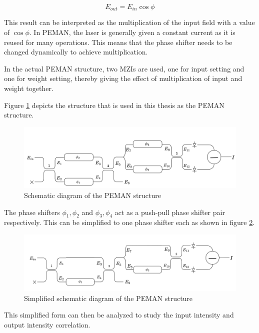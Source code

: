 \begin{equation}
	E_{out} = E_{in}\cos \phi
\end{equation}

This result can be interpreted as the multiplication of the input field with a value of $\cos \phi$. In PEMAN, the laser is generally given a constant current as it is reused for many operations. This means that the phase shifter needs to be changed dynamically to achieve multiplication.

In the actual PEMAN structure, two MZIs are used, one for input setting and one for weight setting, thereby giving the effect of multiplication of input and weight together.

Figure \ref{propPEMAN} depicts the structure that is used in this thesis as the PEMAN structure.

\begin{figure}
	\centering
	\includegraphics[width=\textwidth]{images/propPEMAN.png}
	\caption{Schematic diagram of the PEMAN structure}
	\label{propPEMAN}
\end{figure}

The phase shifters $\phi_1, \phi_2$ and $ \phi_3, \phi_4$ act as a push-pull phase shifter pair respectively. This can be simplified to one phase shifter each as shown in figure \ref{propPEMAN2}.

\begin{figure}
	\centering
	\includegraphics[width=\textwidth]{images/propPEMAN2.png}
	\caption{Simplified schematic diagram of the PEMAN structure}
	\label{propPEMAN2}
\end{figure}

This simplified form can then be analyzed to study the input intensity and output intensity correlation.

